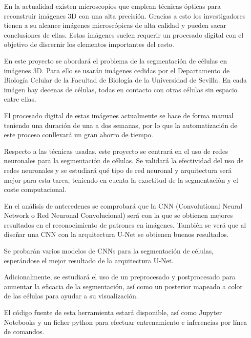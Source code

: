 
En la actualidad existen microscopios que emplean técnicas ópticas para reconstruir imágenes 3D con una alta precisión. Gracias a esto los investigadores tienen a su alcance imágenes microscópicas de alta calidad y pueden sacar conclusiones de ellas. Estas imágenes suelen requerir un procesado digital con el objetivo de discernir los elementos importantes del resto.

En este proyecto se abordará el problema de la segmentación de células en imágenes 3D. Para ello se usarán imágenes  cedidas por el Departamento de Biología Celular de la Facultad de Biología de la Universidad de Sevilla. En cada imágen hay decenas de células, todas en contacto con otras células sin espacio entre ellas.

El procesado digital de estas imágenes actualmente se hace de forma manual teniendo una duración de una a dos semanas, por lo que la automatización de este proceso conllevará un gran ahorro de tiempo.

Respecto a las técnicas usadas, este proyecto se centrará en el uso de redes neuronales para la segmentación de células. Se validará la efectividad del uso de redes neuronales y se estudiará qué tipo de red neuronal y arquitectura será mejor para esta tarea, teniendo en cuenta la exactitud de la segmentación y el coste computacional.

En el análisis de antecedenes se comprobará que la CNN (Convolutional Neural Network o Red Neuronal Convolucional) será con la que se obtienen mejores resultados en el reconocimiento de patrones en imágenes. También se verá que al diseñar una CNN con la arquitectura U-Net se obtienen buenos resultados.

Se probarán varios modelos de CNNs para la segmentación de células, esperándose el mejor resultado de la arquitectura U-Net.

Adicionalmente, se estudiará el uso de un preprocesado y postprocesado para aumentar la eficacia de la segmentación, así como un posterior mapeado a color de las células para ayudar a su visualización.

El código fuente de esta herramienta estará disponible, así como Jupyter Notebooks y un ficher python para efectuar entrenamiento e inferencias por línea de comandos.
